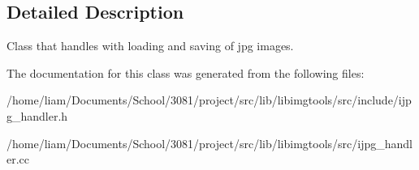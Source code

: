 \subsection{Detailed Description}
Class that handles with loading and saving of jpg images. 

The documentation for this class was generated from the following files\+:\begin{DoxyCompactItemize}
\item 
/home/liam/\+Documents/\+School/3081/project/src/lib/libimgtools/src/include/ijpg\+\_\+handler.\+h\item 
/home/liam/\+Documents/\+School/3081/project/src/lib/libimgtools/src/ijpg\+\_\+handler.\+cc\end{DoxyCompactItemize}
